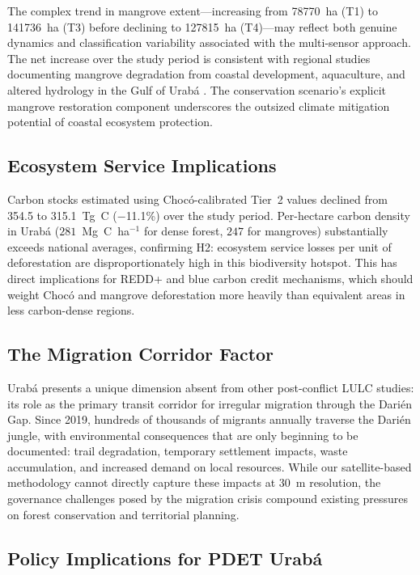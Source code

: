\documentclass[12pt,a4paper]{article}
\begin{document}
The complex trend in mangrove extent---increasing from \num{78770}~ha (T1) to \num{141736}~ha (T3) before declining to \num{127815}~ha (T4)---may reflect both genuine dynamics and classification variability associated with the multi-sensor approach. The net increase over the study period is consistent with regional studies documenting mangrove degradation from coastal development, aquaculture, and altered hydrology in the Gulf of Urab\'{a} \citep{Estrada2014,BlancoLibreros2015}. The conservation scenario's explicit mangrove restoration component underscores the outsized climate mitigation potential of coastal ecosystem protection.

\subsection{Ecosystem Service Implications}

Carbon stocks estimated using Choc\'{o}-calibrated Tier~2 values declined from 354.5 to 315.1~Tg~C ($-$11.1\%) over the study period. Per-hectare carbon density in Urab\'{a} ($281$~Mg~C~ha$^{-1}$ for dense forest, $247$ for mangroves) substantially exceeds national averages, confirming H2: ecosystem service losses per unit of deforestation are disproportionately high in this biodiversity hotspot. This has direct implications for REDD+ and blue carbon credit mechanisms, which should weight Choc\'{o} and mangrove deforestation more heavily than equivalent areas in less carbon-dense regions.

\subsection{The Migration Corridor Factor}

Urab\'{a} presents a unique dimension absent from other post-conflict LULC studies: its role as the primary transit corridor for irregular migration through the Dari\'{e}n Gap. Since 2019, hundreds of thousands of migrants annually traverse the Dari\'{e}n jungle, with environmental consequences that are only beginning to be documented: trail degradation, temporary settlement impacts, waste accumulation, and increased demand on local resources. While our satellite-based methodology cannot directly capture these impacts at 30~m resolution, the governance challenges posed by the migration crisis compound existing pressures on forest conservation and territorial planning.

\subsection{Policy Implications for PDET Urab\'{a}}
\end{document}
